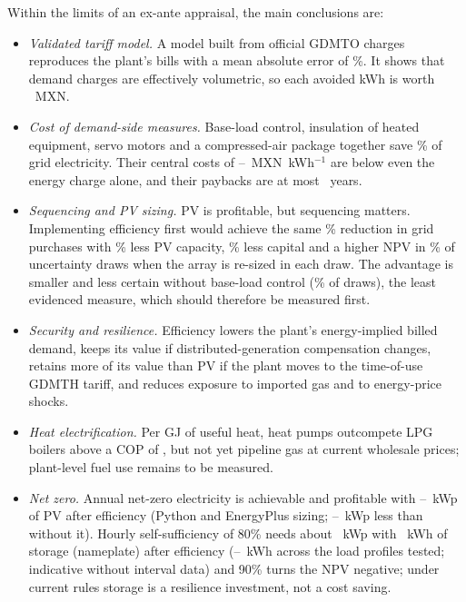 \documentclass[preprint,12pt,authoryear]{elsarticle}
\newcommand{\MXN}{MXN}
\begin{document}
Within the limits of an ex-ante appraisal, the main conclusions are:
\begin{itemize}
\item \emph{Validated tariff model.} A model built from official GDMTO charges reproduces the plant's bills with a mean absolute error of \nTVMape\%. It shows that demand charges are effectively volumetric, so each avoided kWh is worth \nTMarg~\MXN.
\item \emph{Cost of demand-side measures.} Base-load control, insulation of heated equipment, servo motors and a compressed-air package together save \nEESavedPct\% of grid electricity. Their central costs of \nCCEBase--\nCCECA~\MXN~kWh$^{-1}$ are below even the energy charge alone, and their paybacks are at most \nPBMaxEE\ years.
\item \emph{Sequencing and PV sizing.} PV is profitable, but sequencing matters. Implementing efficiency first would achieve the same \nGridTwo\% reduction in grid purchases with \nPVSaveFour\% less PV capacity, \nCapexSaveFour\% less capital and a higher NPV in \nProbFourRTwo\% of uncertainty draws when the array is re-sized in each draw. The advantage is smaller and less certain without base-load control (\nProbNoE\% of draws), the least evidenced measure, which should therefore be measured first.
\item \emph{Security and resilience.} Efficiency lowers the plant's energy-implied billed demand, keeps its value if distributed-generation compensation changes, retains more of its value than PV if the plant moves to the time-of-use GDMTH tariff, and reduces exposure to imported gas and to energy-price shocks.
\item \emph{Heat electrification.} Per GJ of useful heat, heat pumps outcompete LPG boilers above a COP of \nCOPBELPG, but not yet pipeline gas at current wholesale prices; plant-level fuel use remains to be measured.
\item \emph{Net zero.} Annual net-zero electricity is achievable and profitable with \nKWpNZE--\nEPKWpNZE~kWp of PV after efficiency (Python and EnergyPlus sizing; \nNZKWpSave--\nEPKWpSave~kWp less than without it). Hourly self-sufficiency of 80\% needs about \nKWpSSE~kWp with \nBatSSE~kWh of storage (nameplate) after efficiency (\nLSBatLo--\nLSBatHi~kWh across the load profiles tested; indicative without interval data) and 90\% turns the NPV negative; under current rules storage is a resilience investment, not a cost saving.
\end{itemize}
\end{document}
